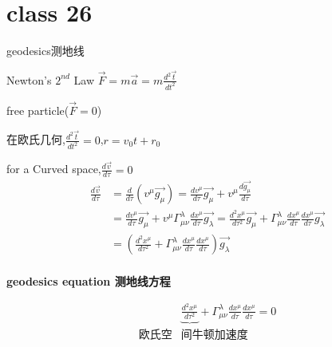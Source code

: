 \documentclass[12pt, a4paper, oneside, UTF8]{ctexbook}  %
\begin{document}
\section{class 26}
\begin{defn}
    geodesics测地线

    Newton's $2^{nd}$ Law \(\vec{F}=m\vec{a}=m\frac{d^2\vec{t}}{dt^2}\)

    free particle(\(\vec{F}=0\))

    在欧氏几何,\(\frac{d^2\vec{t}}{dt^2}=0\),\(r=v_0t+r_0\)

    for a Curved space,\(\frac{d\vec{v}}{d\tau}=0\)
    \begin{align*}
        \frac{d\vec{v}}{d\tau} &=\frac{d}{d\tau}\left(v^\mu\vec{g_\mu}\right)
        =\frac{dv^\mu}{d\tau}\vec{g_\mu}+v^\mu\frac{d\vec{g_\mu}}{d\tau}\\
        &=\frac{dv^\mu}{d\tau}\vec{g_\mu}+v^\mu\Gamma^\lambda_{\mu\nu}
        \frac{dx^\mu}{d\tau}\vec{g_\lambda}
        =\frac{d^2x^\mu}{d\tau^2}\vec{g_\mu}+\Gamma^\lambda_{\mu\nu}
        \frac{dx^\mu}{d\tau}\frac{dx^\mu}{d\tau}\vec{g_\lambda}\\
        &=\left(\frac{d^2x^\mu}{d\tau^2}+\Gamma^\lambda_{\mu\nu}
        \frac{dx^\mu}{d\tau}\frac{dx^\mu}{d\tau}\right)\vec{g_\lambda}\\
    \end{align*}
    \begin{center}
        \textbf{geodesics equation 测地线方程}
    \end{center}
    \begin{align*}
        &\underbrace{\frac{d^2x^\mu}{d\tau^2}}+\Gamma^\lambda_{\mu\nu}\frac{dx^\mu}{d\tau}\frac{dx^\mu}{d\tau}=0\\
        \text{欧氏空}&\text{间牛顿加速度}
    \end{align*}
\end{defn}
\end{document}

